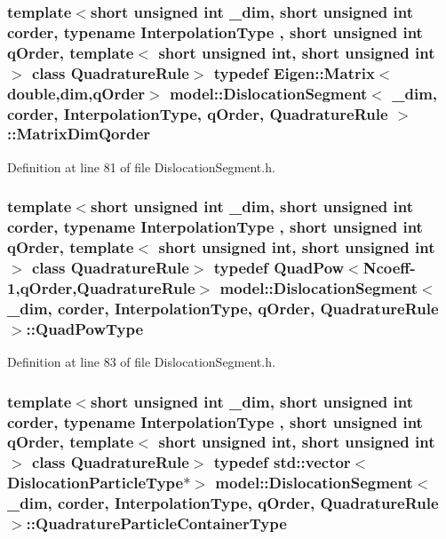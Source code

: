 \subsubsection[{Matrix\+Dim\+Qorder}]{\setlength{\rightskip}{0pt plus 5cm}template$<$short unsigned int \+\_\+dim, short unsigned int corder, typename Interpolation\+Type , short unsigned int q\+Order, template$<$ short unsigned int, short unsigned int $>$ class Quadrature\+Rule$>$ typedef Eigen\+::\+Matrix$<$double,{\bf dim},q\+Order$>$ {\bf model\+::\+Dislocation\+Segment}$<$ \+\_\+dim, corder, Interpolation\+Type, q\+Order, Quadrature\+Rule $>$\+::{\bf Matrix\+Dim\+Qorder}}\label{classmodel_1_1_dislocation_segment_a038d9448e2a98c8da218d1dae63576e1}


Definition at line 81 of file Dislocation\+Segment.\+h.

\hypertarget{classmodel_1_1_dislocation_segment_a3825205d095f7de5ed97545fbfe3580c}{}
\subsubsection[{Quad\+Pow\+Type}]{\setlength{\rightskip}{0pt plus 5cm}template$<$short unsigned int \+\_\+dim, short unsigned int corder, typename Interpolation\+Type , short unsigned int q\+Order, template$<$ short unsigned int, short unsigned int $>$ class Quadrature\+Rule$>$ typedef {\bf Quad\+Pow}$<${\bf Ncoeff}-\/1,q\+Order,Quadrature\+Rule$>$ {\bf model\+::\+Dislocation\+Segment}$<$ \+\_\+dim, corder, Interpolation\+Type, q\+Order, Quadrature\+Rule $>$\+::{\bf Quad\+Pow\+Type}}\label{classmodel_1_1_dislocation_segment_a3825205d095f7de5ed97545fbfe3580c}


Definition at line 83 of file Dislocation\+Segment.\+h.

\hypertarget{classmodel_1_1_dislocation_segment_a86dd32b25521e4af71a4a8cb124abae4}{}
\subsubsection[{Quadrature\+Particle\+Container\+Type}]{\setlength{\rightskip}{0pt plus 5cm}template$<$short unsigned int \+\_\+dim, short unsigned int corder, typename Interpolation\+Type , short unsigned int q\+Order, template$<$ short unsigned int, short unsigned int $>$ class Quadrature\+Rule$>$ typedef std\+::vector$<${\bf Dislocation\+Particle\+Type}$\ast$$>$ {\bf model\+::\+Dislocation\+Segment}$<$ \+\_\+dim, corder, Interpolation\+Type, q\+Order, Quadrature\+Rule $>$\+::{\bf Quadrature\+Particle\+Container\+Type}}\label{classmodel_1_1_dislocation_segment_a86dd32b25521e4af71a4a8cb124abae4}


